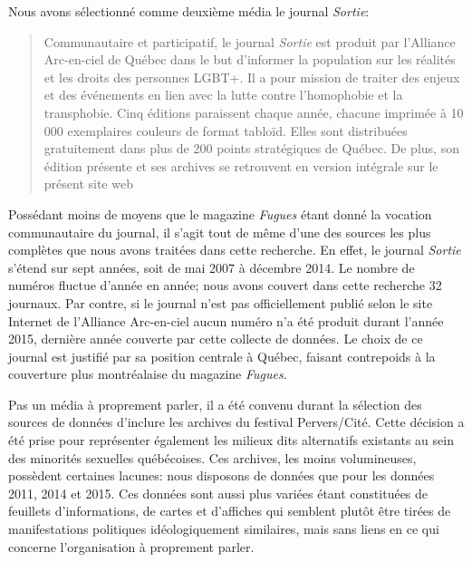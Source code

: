 

Nous avons sélectionné comme deuxième média le journal \emph{Sortie}:
\blockquote[{\cite{AllianceArc2014}}][.]{ Communautaire et participatif, le journal \emph{Sortie} est produit par l’Alliance Arc-en-ciel de Québec dans le but d’informer la population sur les réalités et les droits des personnes LGBT+.
 Il a pour mission de traiter des enjeux et des événements en lien avec la lutte contre l’homophobie et la transphobie.
 Cinq éditions paraissent chaque année, chacune imprimée à 10 000 exemplaires couleurs de format tabloïd.
 Elles sont distribuées gratuitement dans plus de 200 points stratégiques de Québec.
De plus, son édition présente et ses archives se retrouvent en version intégrale sur le présent site web}
Possédant moins de moyens que le magazine \emph{Fugues} étant donné la vocation communautaire du journal, il s'agit tout de même d'une des sources les plus complètes que nous avons traitées dans cette recherche.
En effet, le journal \emph{Sortie} s'étend sur sept années, soit de mai 2007 à décembre 2014.
Le nombre de numéros fluctue d'année en année; nous avons couvert dans cette recherche 32 journaux.
Par contre, si le journal n'est pas officiellement publié selon le site Internet de l'Alliance Arc-en-ciel aucun numéro n'a été produit durant l'année 2015, dernière année couverte par cette collecte de données.
Le choix de ce journal est justifié par sa position centrale à Québec, faisant contrepoids à la couverture plus montréalaise du magazine \emph{Fugues}.

Pas un média à proprement parler, il a été convenu durant la sélection des sources de données d'inclure les archives du festival Pervers/Cité.
Cette décision a été prise pour représenter également les milieux dits alternatifs existants au sein des minorités sexuelles québécoises.
Ces archives, les moins volumineuses, possèdent certaines lacunes: nous disposons de données que pour les données 2011, 2014 et 2015.
Ces données sont aussi plus variées étant constituées de feuillets d'informations, de cartes et d'affiches qui semblent plutôt être tirées de manifestations politiques idéologiquement similaires, mais sans liens en ce qui concerne l'organisation à proprement parler.


